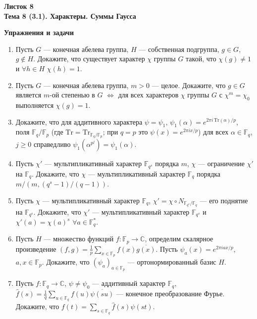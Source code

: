 \documentclass[a4paper, 11pt]{article}
\begin{document}
\begin{center} \Large \bf Листок 8\\ Тема 8 (3.1). Характеры. Суммы Гаусса \end{center}

\noindent\textbf{Упражнения и задачи}

\begin{enumerate}[topsep=0pt]
    \item Пусть $G$ --- конечная абелева группа, $H$ --- собственная подгруппа, $g\in G$, $g \not\in H$. Докажите, что существует характер $\chi$ группы $G$ такой, что $\chi(g)\neq 1$ и $\forall h\in H$ $\chi(h)=1$. %
    \item Пусть $G$ --- конечная абелева группа, $m>0$ --- целое. Докажите, что $g\in G$ является $m$-ой степенью в $G$ $\iff$ для всех характеров $\chi$ группы $G$ с $\chi^m=\chi_0$ выполняется $\chi(g)=1$. %
    \item Докажите, что для аддитивного характера $\psi=\psi_1$, $\psi_1(\alpha)=e^{2\pi i\,\mathrm{Tr}(\alpha)/p}$, поля $\mathbb{F}_q/\mathbb{F}_p$ (где $\mathrm{Tr}=\mathrm{Tr}_{\mathbb{F}_q/\mathbb{F}_p}$; при $q=p$ это $\psi(x)=e^{2\pi i x/p}$) для всех $\alpha\in\mathbb{F}_q$, $j\geqslant 0$ справедливо $\psi_1(\alpha^{p^j})=\psi_1(\alpha)$. %
    \item Пусть $\chi'$ --- мультипликативный характер $\mathbb{F}_{q^s}$ порядка $m$, $\chi$ --- ограничение $\chi'$ на $\mathbb{F}_q$. Докажите, что $\chi$ --- мультипликативный характер $\mathbb{F}_q$ порядка $m/(m,(q^s-1)/(q-1))$. %
    \item Пусть $\chi$ --- мультипликативный характер $\mathbb{F}_q$, $\chi'=\chi\circ N_{\mathbb{F}_{q^s}/\mathbb{F}_q}$ --- его поднятие на $\mathbb{F}_{q^s}$. Докажите, что $\chi'$ --- мультипликативный характер $\mathbb{F}_{q^s}$ и $\chi'(a)=\chi(a)^s$ $\forall a \in\mathbb{F}_q^{*}$. %
    \item Пусть $H$ --- множество функций $f:\mathbb{F}_p\to\mathbb{C}$, определим скалярное произведение $(f,g)=\frac{1}{p}\sum_{x\in\mathbb{F}_p}f(x)\overline{g(x)}$. Пусть $\psi_a(x)=e^{2\pi i ax/p}$, $a,x\in\mathbb{F}_p$. Докажите, что $(\psi_a)_{a\in\mathbb{F}_p}$ --- ортонормированный базис $H$.
    \item Пусть $f:\mathbb{F}_q \rightarrow \mathbb{C}$, $\psi\neq\psi_0$ --- аддитивный характер $\mathbb{F}_q$, $\hat{f}(s) = \frac{1}{q}\sum_{u\in\mathbb{F}_q} f(u)\overline{\psi(su)}$ --- конечное преобразование Фурье. Докажите, что $f(t)=\sum_{s\in\mathbb{F}_q} \hat{f}(s) \psi(st)$. %

\end{enumerate}
\end{document}

